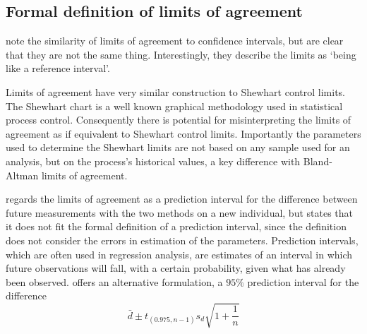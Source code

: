 \documentclass[12pt, a4paper]{report}
\begin{document}
	
	
	\subsection{Formal definition of limits of agreement}
	\citet{BA99} note the similarity of limits of agreement to
	confidence intervals, but are clear that they are not the same
	thing. Interestingly, they describe the limits as `being like a
	reference interval'.
	
	Limits of agreement have very similar construction to Shewhart
	control limits. The Shewhart chart is a well known graphical
	methodology used in statistical process control. Consequently
	there is potential for misinterpreting the limits of agreement as
	if equivalent to Shewhart control limits. Importantly the
	parameters used to determine the Shewhart limits are not based on any sample used for an analysis, but
	on the process's historical values, a key difference with
	Bland-Altman limits of agreement.
	
	\citet{BXC2008} regards the limits of agreement as a prediction
	interval for the difference between future measurements with the
	two methods on a new individual, but states that it does not fit
	the formal definition of a prediction interval, since the
	definition does not consider the errors in estimation of the
	parameters. Prediction intervals, which are often used in
	regression analysis, are estimates of an interval in which future
	observations will fall, with a certain probability, given what has
	already been observed. \citet{BXC2008} offers an alternative
	formulation, a $95\%$ prediction interval for the difference
	\[
	\bar{d} \pm t_{(0.975, n-1)}s_{d} \sqrt{1+\frac{1}{n}}
	\]
	
\end{document}
